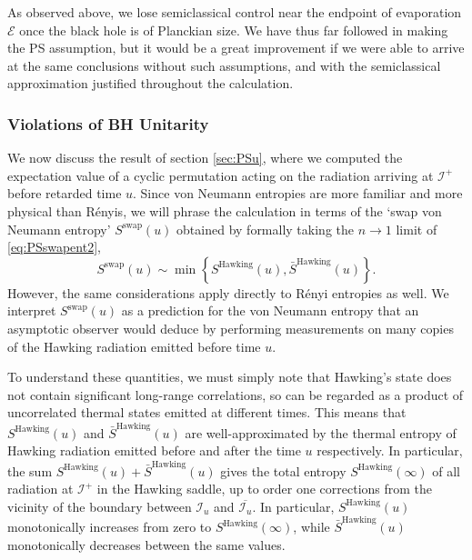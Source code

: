\documentclass[letterpaper,12pt]{article}
\newcommand*{\scri}{\mathscr{I}} %
\newcommand*{\evap}{\mathscr{E}} %
\begin{document}
As observed above, we lose semiclassical control near the endpoint of evaporation $\evap$ once the black hole is of Planckian size.
We have thus far followed \cite{Polchinski:1994zs} in making the PS assumption, but it would be a great improvement if we were able to arrive at the same conclusions without such assumptions, and with the semiclassical approximation justified throughout the calculation.


\subsubsection{Violations of BH Unitarity}
\label{sec:Violate}

We now discuss the result of section \ref{sec:PSu}, where we computed the expectation value of a cyclic permutation acting on the radiation arriving at $\scri^+$ before retarded time $u$. Since von Neumann entropies are more familiar and more physical than R\'enyis, we will phrase the calculation in terms of the `swap von Neumann entropy' $S^\text{swap}(u)$ obtained by formally taking the $n\to 1$ limit of \eqref{eq:PSswapent2},
\begin{equation}\label{eq:PSswapvN}
	S^\text{swap}(u) \sim \min \left\{ S^\text{Hawking}(u),\bar{S}^\text{Hawking}(u) \right\}.
\end{equation}
However, the same considerations apply directly to R\'enyi entropies as well. We interpret $S^\text{swap}(u)$ as a prediction for the von Neumann entropy that an asymptotic observer would deduce by performing measurements on many copies of the Hawking radiation emitted before time $u$.

To understand these quantities, we must simply note that Hawking's state does not contain significant long-range correlations, so can be regarded as a product of uncorrelated thermal states emitted at different times. This means that $S^\text{Hawking}(u)$ and $\bar{S}^\text{Hawking}(u)$ are well-approximated by the thermal entropy of Hawking radiation emitted before and after the time $u$ respectively. In particular, the sum $S^\text{Hawking}(u) + \bar S^\text{Hawking}(u)$ gives the total entropy $S^\text{Hawking}(\infty)$ of all radiation at $\scri^+$ in the Hawking saddle, up to order one corrections from the vicinity of the boundary between $\scri_u$ and $\overline{\scri_u}$. In particular, $S^\text{Hawking}(u)$ monotonically increases from zero to $S^\text{Hawking}(\infty)$, while $\bar{S}^\text{Hawking}(u)$ monotonically decreases between the same values.
\end{document}

